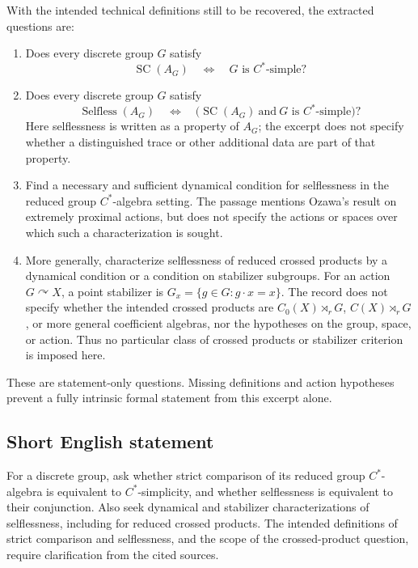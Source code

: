 \documentclass[11pt]{article}
\begin{document}
With the intended technical definitions still to be recovered, the extracted questions are:
\begin{enumerate}
\item Does every discrete group \(G\) satisfy
\[
\operatorname{SC}(A_G)\quad\Longleftrightarrow\quad G\text{ is }C^*\text{-simple}?
\]
\item Does every discrete group \(G\) satisfy
\[
\operatorname{Selfless}(A_G)
\quad\Longleftrightarrow\quad
\bigl(\operatorname{SC}(A_G)\ \text{and}\ G\text{ is }C^*\text{-simple}\bigr)?
\]
Here selflessness is written as a property of \(A_G\); the excerpt does not specify whether a distinguished trace or other additional data are part of that property.
\item Find a necessary and sufficient dynamical condition for selflessness in the reduced group \(C^*\)-algebra setting. The passage mentions Ozawa's result on extremely proximal actions, but does not specify the actions or spaces over which such a characterization is sought.
\item More generally, characterize selflessness of reduced crossed products by a dynamical condition or a condition on stabilizer subgroups. For an action \(G\curvearrowright X\), a point stabilizer is \(G_x=\{g\in G:g\cdot x=x\}\). The record does not specify whether the intended crossed products are \(C_0(X)\rtimes_r G\), \(C(X)\rtimes_r G\), or more general coefficient algebras, nor the hypotheses on the group, space, or action. Thus no particular class of crossed products or stabilizer criterion is imposed here.
\end{enumerate}
These are statement-only questions. Missing definitions and action hypotheses prevent a fully intrinsic formal statement from this excerpt alone.
\subsection{Short English statement}
For a discrete group, ask whether strict comparison of its reduced group \(C^*\)-algebra is equivalent to \(C^*\)-simplicity, and whether selflessness is equivalent to their conjunction. Also seek dynamical and stabilizer characterizations of selflessness, including for reduced crossed products. The intended definitions of strict comparison and selflessness, and the scope of the crossed-product question, require clarification from the cited sources.
\end{document}
